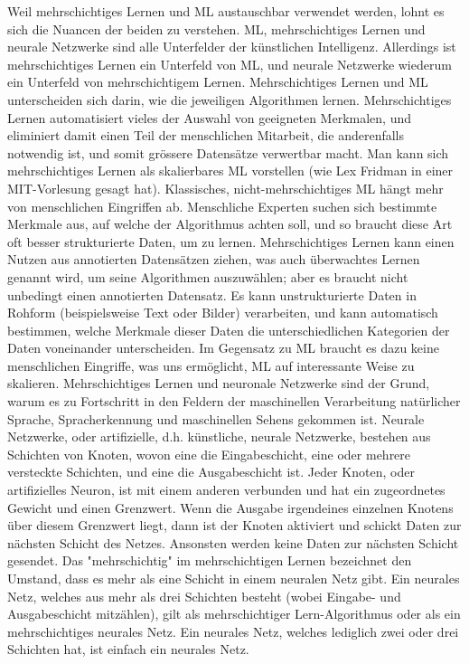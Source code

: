 \begin{lpu}
\begin{artikelbox}
Weil mehrschichtiges Lernen und ML austauschbar verwendet werden, lohnt es sich die Nuancen der beiden zu verstehen. ML, mehrschichtiges Lernen und neurale Netzwerke sind alle Unterfelder der künstlichen Intelligenz. Allerdings ist mehrschichtiges Lernen ein Unterfeld von ML, und neurale Netzwerke wiederum ein Unterfeld von mehrschichtigem Lernen.
Mehrschichtiges Lernen und ML unterscheiden sich darin, wie die jeweiligen Algorithmen lernen. Mehrschichtiges Lernen automatisiert vieles der Auswahl von geeigneten Merkmalen, und eliminiert damit einen Teil der menschlichen Mitarbeit, die anderenfalls notwendig ist, und somit grössere Datensätze verwertbar macht. Man kann sich mehrschichtiges Lernen als skalierbares ML vorstellen (wie Lex Fridman in einer MIT-Vorlesung gesagt hat). Klassisches, nicht-mehrschichtiges ML hängt mehr von menschlichen Eingriffen ab. Menschliche Experten suchen sich bestimmte Merkmale aus, auf welche der Algorithmus achten soll, und so braucht diese Art oft besser strukturierte Daten, um zu lernen.
Mehrschichtiges Lernen kann einen Nutzen aus annotierten Datensätzen ziehen, was auch überwachtes Lernen genannt wird, um seine Algorithmen auszuwählen; aber es braucht nicht unbedingt einen annotierten Datensatz. Es kann unstrukturierte Daten in Rohform (beispielsweise Text oder Bilder) verarbeiten, und kann automatisch bestimmen, welche Merkmale dieser Daten die unterschiedlichen Kategorien der Daten voneinander unterscheiden. Im Gegensatz zu ML braucht es dazu keine menschlichen Eingriffe, was uns ermöglicht, ML auf interessante Weise zu skalieren. Mehrschichtiges Lernen und neuronale Netzwerke sind der Grund, warum es zu Fortschritt in den Feldern der maschinellen Verarbeitung natürlicher Sprache, Spracherkennung und maschinellen Sehens gekommen ist.
Neurale Netzwerke, oder artifizielle, d.h. künstliche, neurale Netzwerke, bestehen aus Schichten von Knoten, wovon eine die Eingabeschicht, eine oder mehrere versteckte Schichten, und eine die Ausgabeschicht ist. Jeder Knoten, oder artifizielles Neuron, ist mit einem anderen verbunden und hat ein zugeordnetes Gewicht und einen Grenzwert. Wenn die Ausgabe irgendeines einzelnen Knotens über diesem Grenzwert liegt, dann ist der Knoten aktiviert und schickt Daten zur nächsten Schicht des Netzes. Ansonsten werden keine Daten zur nächsten Schicht gesendet. Das "mehrschichtig" im mehrschichtigen Lernen bezeichnet den Umstand, dass es mehr als eine Schicht in einem neuralen Netz gibt. Ein neurales Netz, welches aus mehr als drei Schichten besteht (wobei Eingabe- und Ausgabeschicht mitzählen), gilt als mehrschichtiger Lern-Algorithmus oder als ein mehrschichtiges neurales Netz. Ein neurales Netz, welches lediglich zwei oder drei Schichten hat, ist einfach ein neurales Netz.


\end{artikelbox}
\end{lpu}
